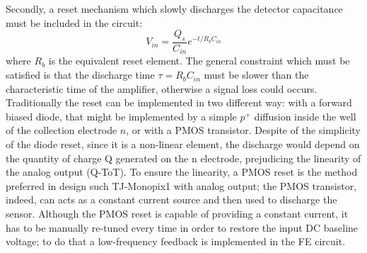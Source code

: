        Secondly, a reset mechanism which slowly discharges the detector capacitance must be included in the circuit:
        \begin{equation}
            V_{in } = \frac{Q_s}{C_{in}}e^{-t/R_bC_{in}}
        \end{equation}
        where $R_b$ is the equivalent reset element. The general constraint which must be satisfied is that the discharge time $\tau=R_bC_{in}$ must be slower than the characteristic time of the amplifier, otherwise a signal loss could occurs.
        Traditionally the reset can be implemented in two different way: with a forward biased diode, that might be implemented by a simple $p^+$ diffusion inside the well of the collection electrode $n$, or with a PMOS transistor. 
        Despite of the simplicity of the diode reset, since it is a non-linear element, the discharge would depend on the quantity of charge Q generated on the n electrode, prejudicing the linearity of the analog output (Q-ToT). To ensure the linearity, a PMOS reset is the method preferred in design such TJ-Monopix1 with analog output; the PMOS transistor, indeed, can acts as a constant current source and then used to discharge the sensor. 
        Although the PMOS reset is capable of providing a constant current, it has to be manually re-tuned every time in order to restore the input DC baseline voltage; to do that a low-frequency feedback is implemented in the FE circuit. 

